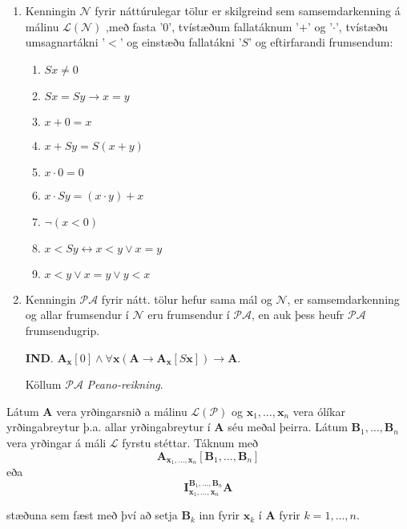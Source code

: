 \documentclass[12pt]{article}
\begin{document}
\begin{skgr}
  \begin{enumerate}[(1)]
  \item  Kenningin $\mathcal{N}$ fyrir náttúrulegar tölur er skilgreind sem
    samsemdarkenning á málinu $\mathcal{L}(\mathcal{N})$
    ,með fasta '$0$', tvístæðum fallatáknum '$+$' og '$\cdot$', tvístæðu umsagnartákni '$<$' og einstæðu fallatákni '$S$' og eftirfarandi
frumsendum:
    \begin{enumerate}
    \item $Sx \neq 0$
    \item $Sx = Sy \rightarrow x = y$
    \item $x + 0 = x$
    \item $x + Sy = S(x+y)$
    \item $x \cdot 0 = 0$
    \item $x \cdot Sy = (x \cdot y) + x$
    \item $\lnot (x < 0)$
    \item $x < Sy \leftrightarrow x < y \vee x = y$
    \item $x < y \vee x = y \vee y < x$
    \end{enumerate}
  \item Kenningin $\mathcal{P}\mathcal{A}$ fyrir nátt. tölur hefur sama mál og
    $\mathcal{N}$, er samsemdarkenning og allar frumsendur í $\mathcal{N}$ eru
    frumsendur í $\mathcal{P}\mathcal{A}$, en auk þess heufr $\mathcal{P}\mathcal{A}$
    frumsendugrip.

    \textbf{IND}. $\mathbf{A}_{\mathbf{x}}[0] \wedge \forall \mathbf{x} ( \mathbf{A} \rightarrow \mathbf{A}_{\mathbf{x}}[S\mathbf{x}]) \rightarrow \mathbf{A}$.

    Köllum $\mathcal{P}\mathcal{A}$ \emph{Peano-reikning}.
  \end{enumerate}
\end{skgr}

\begin{skgr}
  Látum $\mathbf{A}$ vera yrðingarsnið a málinu $\mathcal{L}(\mathcal{P})$
  og $\mathbf{x}_1, \dotsc, \mathbf{x}_n$ vera ólíkar yrðingabreytur
  þ.a. allar yrðingabreytur í $\mathbf{A}$ séu meðal þeirra.
  Látum $\mathbf{B}_1, \dotsc, \mathbf{B}_n$ vera yrðingar á máli
  $\mathcal{L}$ fyrstu stéttar. Táknum með
  \[ \mathbf{A}_{\mathbf{x}_1, \dotsc, \mathbf{x}_n}[\mathbf{B}_1, \dotsc, \mathbf{B}_n] \]
  eða
  \[\mathbf{I}^{\mathbf{B}_1, \dotsc, \mathbf{B}_n}_{\mathbf{x}_1, \dotsc, \mathbf{x}_n} \mathbf{A}\]

  stæðuna sem fæst með því að setja $\mathbf{B}_k$ inn fyrir $\mathbf{x}_k$ í $\mathbf{A}$ fyrir
  $k = 1, \dotsc, n$.
\end{skgr}
\end{document}
